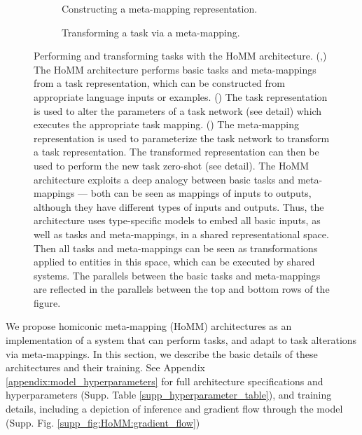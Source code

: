 \begin{figure}[htbp]
{\begin{tikzpicture}[auto]
\end{tikzpicture}
}
\begin{subfigure}{0.39\textwidth}
\caption{Constructing a meta-mapping representation.}\label{fig:HoMM_architecture:constructing_meta}
\end{subfigure}%
\begin{subfigure}{0.61\textwidth}
\caption{Transforming a task via a meta-mapping.}\label{fig:HoMM_architecture:performing_meta}
\end{subfigure}
\caption[Performing and transforming tasks with the HoMM architecture.]{Performing and transforming tasks with the HoMM architecture. (,) The HoMM architecture performs basic tasks and meta-mappings from a task representation, which can be constructed from appropriate language inputs or examples.  () The task representation is used to alter the parameters of a task network (see detail) which executes the appropriate task mapping. () The meta-mapping representation is used to parameterize the task network to transform a task representation. The transformed representation can then be used to perform the new task zero-shot (see detail). The HoMM architecture exploits a deep analogy between basic tasks and meta-mappings --- both can be seen as mappings of inputs to outputs, although they have different types of inputs and outputs. Thus, the architecture uses type-specific models to embed all basic inputs, as well as tasks and meta-mappings, in a shared representational space. Then all tasks and meta-mappings can be seen as transformations applied to entities in this space, which can be executed by shared systems. The parallels between the basic tasks and meta-mappings are reflected in the parallels between the top and bottom rows of the figure.} \label{fig:HoMM_architecture}
\end{figure}

We propose homiconic meta-mapping (HoMM) architectures as an implementation of a system that can perform tasks, and adapt to task alterations via meta-mappings. In this section, we describe the basic details of these architectures and their training. See Appendix \ref{appendix:model_hyperparameters} for full architecture specifications and hyperparameters (Supp. Table \ref{supp_hyperparameter_table}), and training details, including a depiction of inference and gradient flow through the model (Supp. Fig. \ref{supp_fig:HoMM:gradient_flow})

